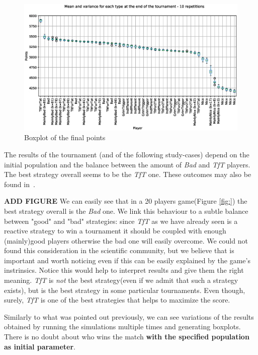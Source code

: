 \documentclass[journal,a4paper,10pt,twoside]{IEEEtran} %
\begin{document}
\begin{figure}[!ht]
    \centering
    \includegraphics[width=1\columnwidth]{../img/ipdmp/ipdmp-boxplot-final-points-50}
    \caption{Boxplot of the final points}
    \label{fig:boxIPDMPfinal}
\end{figure}

The results of the tournament (and of the following study-cases) depend on the initial population and the balance between the amount of \textit{Bad} and \textit{TfT} players. The best strategy overall seems to be the \textit{TfT} one.
These outcomes may also be found in~\cite{mathieu2017}.

\textbf{ADD FIGURE}
We can easily see that in a 20 players game(Figure \ref{fig:}) the best strategy overall is the \textit{Bad} one. We link this behaviour to a subtle balance between "good" and "bad" strategies: since \textit{TfT} as we have already seen is a reactive strategy to win a tournament it should be coupled with enough (mainly)good players otherwise the bad one will easily overcome. We could not found this consideration in the scientific community, but we believe that is important and worth noticing even if this can be easily explained by the game's instrinsics. Notice this would help to interpret results and give them the right meaning. \textit{TfT} is \textit{not} the best strategy(even if we admit that such a strategy exists), but is the best strategy in some particular tournaments. Even though, surely, \textit{TfT} is one of the best strategies that helps to maximize the score.

Similarly to what was pointed out previously, we can see variations of the results obtained by running the simulations multiple times and generating boxplots. There is no doubt about who wins the match \textbf{with the specified population as initial parameter}.
\end{document}
